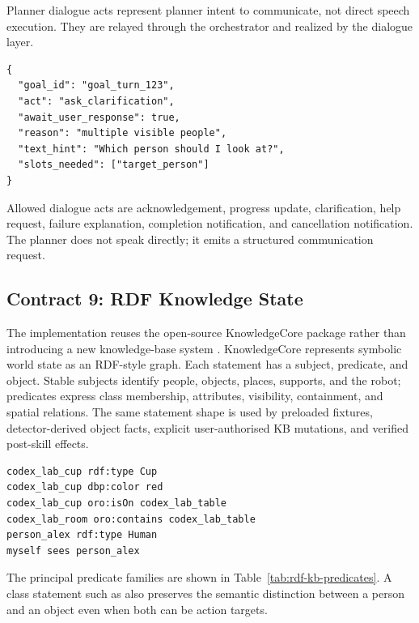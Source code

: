 Planner dialogue acts represent planner intent to communicate, not direct speech execution. They are relayed through the orchestrator and realized by the dialogue layer.

\begin{lstlisting}
{
  "goal_id": "goal_turn_123",
  "act": "ask_clarification",
  "await_user_response": true,
  "reason": "multiple visible people",
  "text_hint": "Which person should I look at?",
  "slots_needed": ["target_person"]
}
\end{lstlisting}

Allowed dialogue acts are acknowledgement, progress update, clarification, help request, failure explanation, completion notification, and cancellation notification. The planner does not speak directly; it emits a structured communication request.

\subsection{Contract 9: RDF Knowledge State}

The implementation reuses the open-source KnowledgeCore package rather than introducing a new knowledge-base system \parencite{knowledgecore}. KnowledgeCore represents symbolic world state as an RDF-style graph. Each statement has a subject, predicate, and object. Stable subjects identify people, objects, places, supports, and the robot; predicates express class membership, attributes, visibility, containment, and spatial relations. The same statement shape is used by preloaded fixtures, detector-derived object facts, explicit user-authorised KB mutations, and verified post-skill effects.

\begin{lstlisting}
codex_lab_cup rdf:type Cup
codex_lab_cup dbp:color red
codex_lab_cup oro:isOn codex_lab_table
codex_lab_room oro:contains codex_lab_table
person_alex rdf:type Human
myself sees person_alex
\end{lstlisting}

The principal predicate families are shown in Table~\ref{tab:rdf-kb-predicates}. A class statement such as  also preserves the semantic distinction between a person and an object even when both can be action targets.

